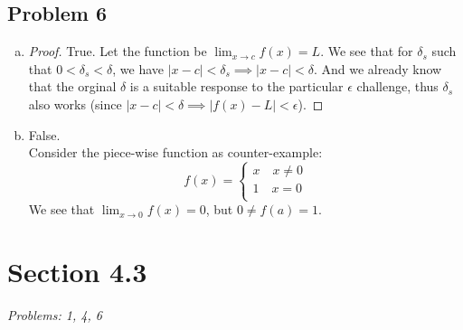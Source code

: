 \documentclass[12pt]{article}
\begin{document}
\subsection*{Problem 6}
\begin{enumerate}[a).]
    \item {
        \begin{proof}
            True. Let the function be $\lim_{x \rightarrow c} f(x) = L$. 
            We see that for $\delta_s$ such that $0 < \delta_s < \delta$, we have $|x - c| < \delta_s \implies |x -c| < \delta$.
            And we already know that the orginal $\delta$ is a suitable response to the particular $\epsilon$ challenge, thus $\delta_s$ also works (since $|x - c| < \delta \implies |f(x) - L| < \epsilon$). 
        \end{proof}
    }
    \item {
        False.\\
        Consider the piece-wise function as counter-example:
        $$ 
        f(x) = \left\{ 
            \begin{array}{ll} 
                x \quad   x \ne 0\\
                1 \quad   x = 0\\
            \end{array} \right.
        $$
        We see that $\lim_{x \rightarrow 0} f(x) = 0$, but $0 \ne f(a) = 1$. 
    }
\end{enumerate}


\section*{Section 4.3}
\textit{Problems: 1, 4, 6}
\end{document}
